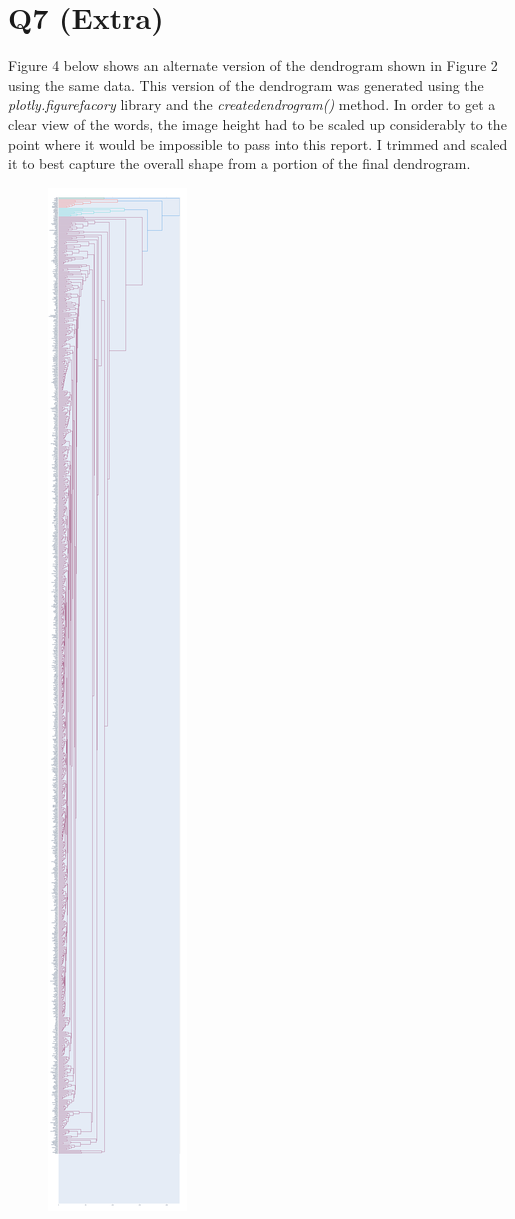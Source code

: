 \documentclass[12pt]{article}
\begin{document}
\section*{Q7 (Extra)}
Figure 4 below shows an alternate version of the dendrogram shown in Figure 2 using the same data. This version of the dendrogram was generated using the \emph{plotly.figure\textunderscore facory} library and the \emph{create\textunderscore dendrogram()} method.
In order to get a clear view of the words, the image height had to be scaled up considerably to the point where it would be impossible to pass into this report. I trimmed and scaled it to best capture the overall shape from a portion of the final dendrogram.
\begin{figure}[H]
            \centering
            \includegraphics[scale=0.15,trim = 9 8500 0 0, clip]{clusters_plotly.png}

\end{figure}
\end{document}

